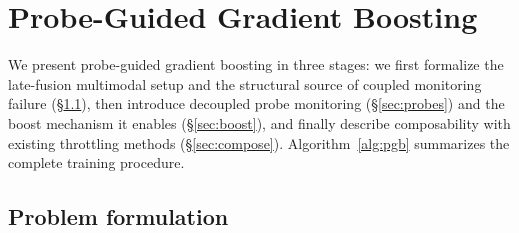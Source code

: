 \documentclass{article}
\begin{document}
\section{Probe-Guided Gradient Boosting}
\label{sec:method}

We present probe-guided gradient boosting in three stages: we first formalize the late-fusion multimodal setup and the structural source of coupled monitoring failure (\S\ref{sec:problem}), then introduce decoupled probe monitoring (\S\ref{sec:probes}) and the boost mechanism it enables (\S\ref{sec:boost}), and finally describe composability with existing throttling methods (\S\ref{sec:compose}). Algorithm~\ref{alg:pgb} summarizes the complete training procedure.

\subsection{Problem formulation}
\label{sec:problem}
\end{document}

